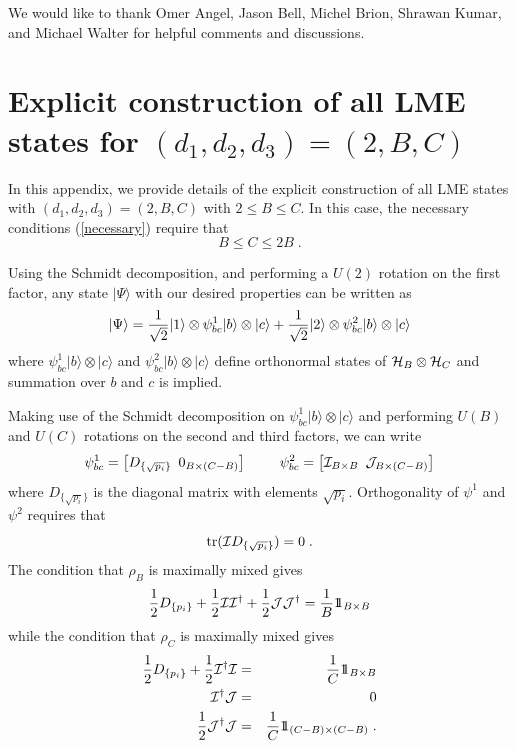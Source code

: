 \documentclass[12pt]{article}
\theoremstyle{definition}
\newcommand{\be}{\begin{equation}}
\newcommand{\ee}{\end{equation}}
\newcommand{\bea}{\begin{eqnarray}}
\newcommand{\eea}{\end{eqnarray}}
\def\identity{{\rlap{1} \hskip 1.6pt \hbox{1}}}
\newcommand{\tr}{{\rm tr}}
\begin{document}
We would like to thank Omer Angel, Jason Bell, Michel Brion, Shrawan Kumar, and Michael Walter for helpful comments and discussions.

\appendix

\section{Explicit construction of all LME states for $(d_1,d_2,d_3) = (2,B,C)$}

In this appendix, we provide details of the explicit construction of all LME states with $(d_1, d_2, d_3) = (2,B,C)$ with $2 \le B \le C$. In this case, the necessary conditions (\ref{necessary}) require that
\be
B \le C \le 2 B \; .
\ee

Using the Schmidt decomposition, and performing a $U(2)$ rotation on the first factor, any state $|\Psi \rangle$ with our desired properties can be written as
\be
|\Psi \rangle = {1 \over \sqrt{2}} | 1 \rangle \otimes \psi^1_{bc} |b\rangle \otimes |c \rangle + {1 \over \sqrt{2}} | 2 \rangle \otimes \psi^2_{bc} |b\rangle \otimes |c \rangle
\ee
where $\psi^1_{bc} |b\rangle \otimes |c \rangle$ and $\psi^2_{bc} |b\rangle \otimes |c \rangle$ define orthonormal states of ${\cal H}_B \otimes {\cal H}_C$ and summation over $b$ and $c$ is implied.

Making use of the Schmidt decomposition on $\psi^1_{bc} |b\rangle \otimes |c \rangle$ and performing $U(B)$ and $U(C)$ rotations on the second and third factors, we can write
\be
\psi^1_{bc} = {\large \left[D_{\{\sqrt{p_i}\}} \, \, \,  0_{B \times (C-B)} \right] \qquad
\psi^2_{bc} = \left[{\cal I}_{B \times B} \, \, \, {\cal J}_{B \times (C-B)} \right]}
\ee
where $D_{\{\sqrt{p_i}\}}$ is the diagonal matrix with elements $\sqrt{p_i}$. Orthogonality of $\psi^1$ and $\psi^2$ requires that
\be
\label{cond1}
\tr({\cal I}D_{\{ \sqrt{p_i} \}}) = 0 \; .
\ee
The condition that $\rho_B$ is maximally mixed gives
\be
\label{cond2}
{1 \over 2} D_{\{p_i\}} + {1 \over 2} {\cal I} {\cal I}^\dagger + {1 \over 2} {\cal J} {\cal J}^\dagger = {1 \over B} \identity_{B \times B}
\ee
while the condition that $\rho_C$ is maximally mixed gives
\bea
\label{cond3}
{1 \over 2} D_{\{p_i\}} + {1 \over 2} {\cal I}^\dagger {\cal I}  &=& {1 \over C} \identity_{B \times B} \\
\label{cond4}
{\cal I}^\dagger {\cal J} &=& 0 \\
{1 \over 2} {\cal J}^\dagger {\cal J} &=& {1 \over C} \identity_{(C-B) \times (C-B)} \; .
\label{cond5}
\eea
\end{document}
